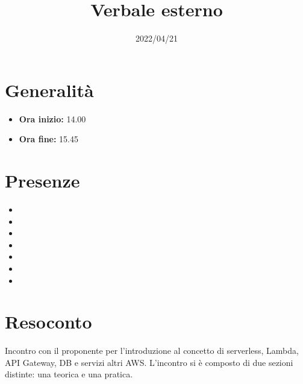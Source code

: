 \documentclass{classes/base}
\title{Verbale esterno}
\date{2022/04/21}
\author{\giulio}
\renewcommand{\maketitle}{
    
}
\begin{document}
    \maketitle

    \section*{Generalità}
    \begin{itemize}
        \item \textbf{Ora inizio:} 14.00
        \item \textbf{Ora fine:} 15.45
    \end{itemize}

    \section*{Presenze}
    \begin{itemize}
	    \item \angela
	    \item \marcob
        \item \tommaso
        \item \ruth
        \item \matteo
        \item \marcov
        \item \giulio
    \end{itemize}

    \section*{Resoconto}
    Incontro con il proponente per l'introduzione al concetto di serverless, Lambda, API Gateway, DB e servizi altri AWS.
    L'incontro si è composto di due sezioni distinte: una teorica e una pratica.
\end{document}
